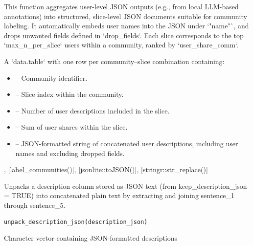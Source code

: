 \documentclass[a4paper]{book}
\begin{document}
%
\begin{Details}
This function aggregates user-level JSON outputs (e.g., from local LLM-based
annotations) into structured, slice-level JSON documents suitable for community
labeling. It automatically embeds user names into the JSON under `"name"`, and
drops unwanted fields defined in `drop\_fields`. Each slice corresponds to the
top `max\_n\_per\_slice` users within a community, ranked by `user\_share\_comm`.
\end{Details}
%
\begin{Value}
A `data.table` with one row per community–slice combination containing:
\begin{itemize}

\item{}  – Community identifier.
\item{}  – Slice index within the community.
\item{}  – Number of user descriptions included in the slice.
\item{}  – Sum of user shares within the slice.
\item{}  – JSON-formatted string of concatenated user descriptions,
including user names and excluding dropped fields.

\end{itemize}

\end{Value}
%
\begin{SeeAlso}
, [label\_communities()], [jsonlite::toJSON()], [stringr::str\_replace()]
\end{SeeAlso}
%
\begin{Description}
Unpacks a description column stored as JSON text (from keep\_description\_json = TRUE) 
into concatenated plain text by extracting and joining sentence\_1 through sentence\_5.
\end{Description}
%
\begin{Usage}
\begin{verbatim}
unpack_description_json(description_json)
\end{verbatim}
\end{Usage}
%
\begin{Arguments}
\begin{ldescription}
\item[\code{description\_json}] Character vector containing JSON-formatted descriptions
\end{ldescription}
\end{Arguments}
\end{document}
